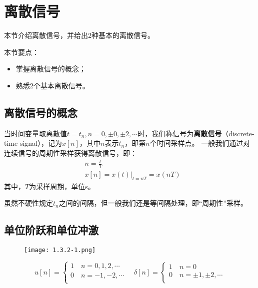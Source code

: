 \section{离散信号}

本节介绍离散信号，并给出2种基本的离散信号。

本节要点：
\begin{itemize}
    \item 掌握离散信号的概念；
    \item 熟悉2个基本离散信号。
\end{itemize}

\subsection{离散信号的概念}

\begin{definition}[离散信号]
当时间变量取离散值$t=t_n,n=0,\pm 0,\pm 2,\cdots $时，我们称信号为{\bf 离散信号}（discrete-time signal），记为$x\left[ n \right] $，其中$n$表示$t_n$，即第$n$个时间采样点。
一般我们通过对连续信号的周期性采样获得离散信号，即：
\begin{align*}
&n=\frac{t}{T} \\
&x\left[ n \right] =\left. x\left( t \right) \right|_{t=nT}=x\left( nT \right)
\end{align*}
其中，$T$为采样周期，单位s。
\end{definition}

虽然不硬性规定$t_n$之间的间隔，但一般我们还是等间隔处理，即“周期性”采样。

\subsection{单位阶跃和单位冲激}

\begin{figure}[h]
\centering
\texttt{[image: 1.3.2-1.png]}
\end{figure}
\[
u\left[ n \right] =\begin{cases}
	1 \quad n=0,1,2,\cdots\\
	0 \quad n=-1,-2,\cdots\\
\end{cases} \quad \delta \left[ n \right] =\begin{cases}
	1 \quad n=0\\
	0 \quad n=\pm 1,\pm 2,\cdots\\
\end{cases}
\]




